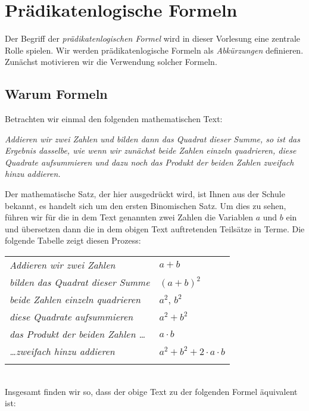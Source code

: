 \chapter{Pr\"adikatenlogische Formeln}
Der Begriff der \emph{pr\"adikatenlogischen Formel} wird in dieser Vorlesung eine zentrale
Rolle spielen.  Wir werden pr\"adikatenlogische Formeln als \emph{Abk\"urzungen} definieren.  
Zun\"achst motivieren wir die Verwendung solcher Formeln.

\section{Warum Formeln}
Betrachten wir einmal den folgenden mathematischen Text: 
\begin{center}
\begin{minipage}{14cm}
{\em 
  Addieren wir zwei Zahlen und bilden dann das Quadrat dieser Summe, so ist das Ergebnis dasselbe,
  wie wenn wir zun\"achst beide Zahlen einzeln quadrieren, diese Quadrate aufsummieren 
  und dazu noch das Produkt der beiden Zahlen zweifach hinzu addieren.
}
\end{minipage}
\end{center}
Der mathematische Satz, der hier ausgedr\"uckt wird, ist Ihnen aus der Schule bekannt,
es handelt sich um den ersten Binomischen Satz.  Um dies zu sehen, f\"uhren wir f\"ur die
in dem Text genannten zwei Zahlen die Variablen $a$ und $b$ ein und \"ubersetzen dann die 
in dem obigen Text auftretenden Teils\"atze in Terme.  Die folgende Tabelle zeigt diesen Prozess: \\[0.3cm]
\hspace*{1.3cm} 
\begin{tabular}{ll}
  \emph{Addieren wir zwei Zahlen} & $a+b$ \\
  \emph{bilden das Quadrat dieser Summe} & $(a+b)^2$ \\
  \emph{beide Zahlen einzeln quadrieren} & $a^2$, $b^2$ \\
  \emph{diese Quadrate aufsummieren} & $a^2 + b^2$ \\
  \emph{das Produkt der beiden Zahlen \ldots} & $a\cdot b$ \\
  \emph{\ldots zweifach hinzu addieren} & $a^2 + b^2 + 2\cdot a \cdot b $ \\
  \emph{} & $ $ \\
\end{tabular} \\
Insgesamt finden wir so, dass der obige Text zu der folgenden Formel \"aquivalent ist: \\[0.2cm]

